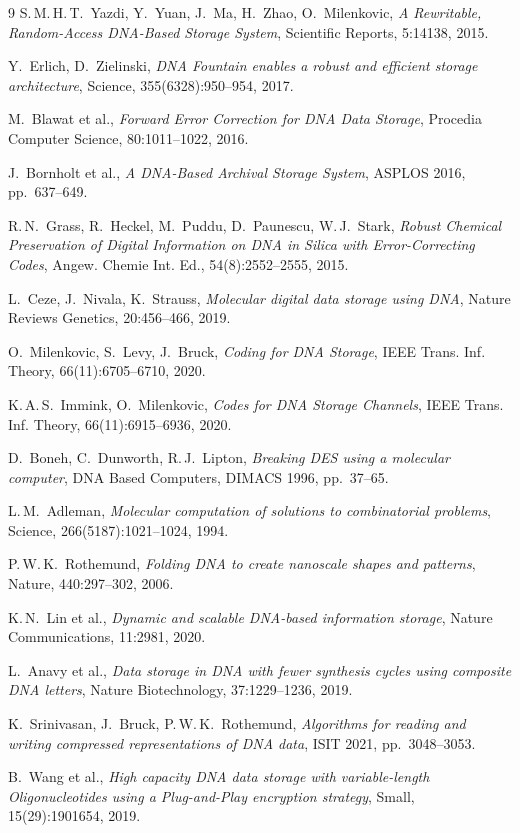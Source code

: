 ﻿\documentclass[a4paper,12pt]{article}
\theoremstyle{definition}
\theoremstyle{plain}
\begin{document}
\begin{thebibliography}{9}
  S.\,M.\,H.\,T.~Yazdi, Y.~Yuan, J.~Ma, H.~Zhao, O.~Milenkovic,
  \textit{A Rewritable, Random-Access DNA-Based Storage System},
  Scientific Reports, 5:14138, 2015.

  Y.~Erlich, D.~Zielinski,
  \textit{DNA Fountain enables a robust and efficient storage architecture},
  Science, 355(6328):950--954, 2017.

  M.~Blawat et al.,
  \textit{Forward Error Correction for DNA Data Storage},
  Procedia Computer Science, 80:1011--1022, 2016.

  J.~Bornholt et al.,
  \textit{A DNA-Based Archival Storage System},
  ASPLOS 2016, pp.~637--649.

  R.\,N.~Grass, R.~Heckel, M.~Puddu, D.~Paunescu, W.\,J.~Stark,
  \textit{Robust Chemical Preservation of Digital Information on DNA in
  Silica with Error-Correcting Codes},
  Angew. Chemie Int. Ed., 54(8):2552--2555, 2015.

  L.~Ceze, J.~Nivala, K.~Strauss,
  \textit{Molecular digital data storage using DNA},
  Nature Reviews Genetics, 20:456--466, 2019.

  O.~Milenkovic, S.~Levy, J.~Bruck,
  \textit{Coding for DNA Storage},
  IEEE Trans. Inf. Theory, 66(11):6705--6710, 2020.

  K.\,A.\,S.~Immink, O.~Milenkovic,
  \textit{Codes for DNA Storage Channels},
  IEEE Trans. Inf. Theory, 66(11):6915--6936, 2020.

  D.~Boneh, C.~Dunworth, R.\,J.~Lipton,
  \textit{Breaking DES using a molecular computer},
  DNA Based Computers, DIMACS 1996, pp.~37--65.

  L.\,M.~Adleman,
  \textit{Molecular computation of solutions to combinatorial problems},
  Science, 266(5187):1021--1024, 1994.

  P.\,W.\,K.~Rothemund,
  \textit{Folding DNA to create nanoscale shapes and patterns},
  Nature, 440:297--302, 2006.

  K.\,N.~Lin et al.,
  \textit{Dynamic and scalable DNA-based information storage},
  Nature Communications, 11:2981, 2020.

  L.~Anavy et al.,
  \textit{Data storage in DNA with fewer synthesis cycles using composite
  DNA letters},
  Nature Biotechnology, 37:1229--1236, 2019.

  K.~Srinivasan, J.~Bruck, P.\,W.\,K.~Rothemund,
  \textit{Algorithms for reading and writing compressed representations
  of DNA data},
  ISIT 2021, pp.~3048--3053.

  B.~Wang et al.,
  \textit{High capacity DNA data storage with variable-length Oligonucleotides
  using a Plug-and-Play encryption strategy},
  Small, 15(29):1901654, 2019.

\end{thebibliography}
\end{document}
